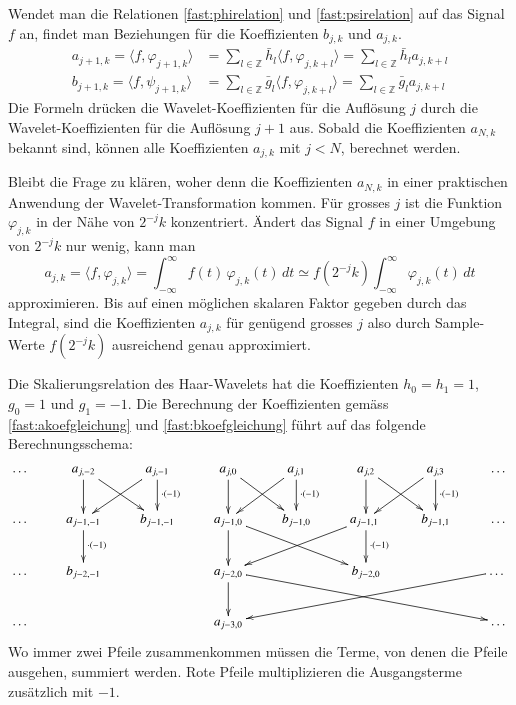 Wendet man die Relationen \eqref{fast:phirelation} und \eqref{fast:psirelation}
auf das Signal $f$ an, findet man Beziehungen für die
Koeffizienten $b_{j,k}$ und $a_{j,k}$.
\begin{align}
a_{j+1,k}
=
\langle f,\varphi_{j+1,k} \rangle
&=
\sum_{l\in\mathbb Z} \bar{h}_l \langle f,\varphi_{j,k+l}\rangle
=
\sum_{l\in\mathbb Z} \bar{h}_l a_{j,k+l}
\label{fast:akoefgleichung}
\\
b_{j+1,k}
=
\langle f,\psi_{j+1,k} \rangle
&=
\sum_{l\in\mathbb Z} \bar{g}_l \langle f,\varphi_{j,k+l}\rangle
=
\sum_{l\in\mathbb Z} \bar{g}_l a_{j,k+l}
\label{fast:bkoefgleichung}
\end{align}
Die Formeln drücken die Wavelet-Koeffizienten für die Auflösung $j$ durch
die Wavelet-Koeffizienten für die Auflösung $j+1$ aus.
Sobald die Koeffizienten $a_{N,k}$ bekannt sind, können alle Koeffizienten
$a_{j,k}$ mit $j<N$, berechnet werden.

Bleibt die Frage zu klären, woher denn die Koeffizienten $a_{N,k}$ in einer
praktischen Anwendung der Wavelet-Transformation kommen.
Für grosses $j$ ist die Funktion $\varphi_{j,k}$ in der Nähe von $2^{-j}k$
konzentriert.
Ändert das Signal $f$ in einer Umgebung von $2^{-j}k$ nur wenig, kann man
\begin{equation*}
a_{j,k}
=
\langle f,\varphi_{j,k}\rangle
=
\int_{-\infty}^\infty f(t)\, \varphi_{j,k}(t)\,dt
\simeq
f(2^{-j}k)
\int_{-\infty}^\infty \varphi_{j,k}(t)\,dt
\end{equation*}
approximieren.
Bis auf einen möglichen skalaren Faktor gegeben durch das Integral, sind
die Koeffizienten $a_{j,k}$ für genügend grosses $j$ also durch
Sample-Werte $f(2^{-j}k)$ ausreichend genau approximiert.

\begin{beispiel}
Die Skalierungsrelation des Haar-Wavelets hat die Koeffizienten
$h_0=h_1=1$, $g_0=1$ und $g_1=-1$.
Die Berechnung der Koeffizienten gemäss \eqref{fast:akoefgleichung}
und \eqref{fast:bkoefgleichung} führt auf das folgende Berechnungsschema:
\[
\xymatrix{
\dots
	&a_{j,-2} \ar[d] \ar[dr]
		&a_{j,-1} {\color{red}\ar[d]^{\cdot (-1)}} \ar[dl]
			&a_{j,0} \ar[d] \ar[dr]
				&a_{j,1} {\color{red}\ar[d]^{\cdot (-1)}} \ar[dl]
					&a_{j,2} \ar[d] \ar[dr]
						&a_{j,3} {\color{red}\ar[d]^{\cdot (-1)}} \ar[dl]
							&\dots
\\
\dots
	&a_{j-1,-1} {\color{red}\ar[d]^{\cdot(-1)}}
		&b_{j-1,-1}
			&a_{j-1,0}\ar[d] \ar[drr]
				&b_{j-1,0}
					&a_{j-1,1} {\color{red}\ar[d]^{\cdot (-1)}} \ar[dll]
						&b_{j-1,1}
							&\dots
\\
\dots &b_{j-2,-1} 
		&
			&a_{j-2,0} \ar[d] \ar[drrrr]
				&
					&b_{j-2,0}
						&
							&\dots \ar[dllll]
\\
\dots &
		&
			&a_{j-3,0}
				&
					&
						&
							&\dots
}
\]
Wo immer zwei Pfeile zusammenkommen müssen die Terme, von denen die Pfeile ausgehen, 
summiert werden. Rote Pfeile multiplizieren die Ausgangsterme zusätzlich mit $-1$.
\end{beispiel}




